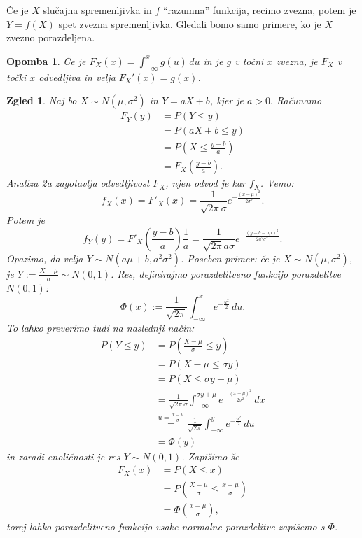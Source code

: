\documentclass[10pt, a4paper]{article}
\newtheorem*{opomba}{Opomba}
\newtheorem{zgled}[izr]{Zgled}
\begin{document}
Če je $X$ slučajna spremenljivka in $f$ "`razumna"' funkcija, recimo zvezna,
potem je $Y = f(X)$ spet zvezna spremenljivka.
Gledali bomo samo primere, ko je $X$ zvezno porazdeljena.

\begin{opomba}
    Če je $F_X (x) = \int_{-\infty} ^x g(u)\, du$
    in je $g$ v točni $x$ zvezna, je $F_X$ v točki $x$ odvedljiva in velja $F_X' (x) = g(x)$.
\end{opomba}

\begin{zgled}
  Naj bo $X \sim N(\mu, \sigma^2)$ in $Y = aX + b$, kjer je $a > 0.$ Računamo 
  \begin{align*}
    F_Y(y) &= P(Y \leq y)\\
    &= P(aX + b \leq y)\\
    &= P\left(X \leq \frac{y - b}{a}\right)\\
    &= F_X \left(\frac{y - b}{a}\right).
  \end{align*}
  Analiza 2a zagotavlja odvedljivost $F_X$, njen odvod je kar $f_X$. Vemo:
  $$f_X (x) = F'_X (x) = \frac{1}{\sqrt{2\pi} \sigma} e^{-\frac{(x - \mu)^2}{2 \sigma^2}}.$$
  Potem je $$f_Y (y) = F'_X\left(\frac{y - b}{a}\right) \frac{1}{a} = \frac{1}{\sqrt{2\pi} a \sigma} e^{-\frac{(y - b - a\mu)^2}{2a^2\sigma^2}}.$$
  Opazimo, da velja $Y \sim N(a \mu + b, a^2 \sigma^2)$.
  Poseben primer: če je $X \sim N(\mu, \sigma^2)$, je $Y := \frac{X - \mu}{\sigma} \sim N(0, 1)$.
  Res, definirajmo porazdelitveno funkcijo porazdelitve $N(0, 1)$:
  $$\Phi(x) := \frac{1}{\sqrt{2 \pi}} \int_{-\infty} ^x e^{-\frac{u^2}{2}}\, du.$$
  To lahko preverimo tudi na naslednji način:
  \begin{align*}
    P(Y \leq y) &= P\left(\frac{X - \mu}{\sigma} \leq y\right)\\
    &= P(X - \mu \leq \sigma y)\\
    &= P(X \leq \sigma y + \mu)\\
    &= \frac{1}{\sqrt{2 \pi} \sigma} \int_{-\infty} ^{\sigma y + \mu} e^{-\frac{(x - \mu)^2}{2 \sigma^2}}\, dx\\
    &\stackrel{u = \frac{x - \mu}{\sigma}}{=} \frac{1}{\sqrt{2 \pi}} \int_{-\infty} ^y e^{-\frac{u^2}{2}}\, du\\
    &= \Phi(y)
  \end{align*}
  in zaradi enoličnosti je res $Y \sim N(0, 1)$.
  Zapišimo še 
  \begin{align*}
    F_X(x) &= P(X \leq x)\\
    &= P\left(\frac{X - \mu}{\sigma} \leq \frac{x - \mu}{\sigma}\right)\\
    &= \Phi\left(\frac{x - \mu}{\sigma}\right),
  \end{align*}
  torej lahko porazdelitveno funkcijo vsake normalne porazdelitve zapišemo s $\Phi$.
\end{zgled}
\end{document}
